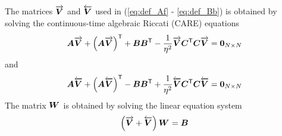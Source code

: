 The matrices $\overrightarrow{\bm{V}}$ and $\overleftarrow{\bm{V}}$ used in (\ref{eq:def_Af} - \ref{eq:def_Bb}) is obtained by solving the continuous-time algebraic Riccati (CARE) equations
\begin{equation}
    \label{eq:Vf_care}
    \bm{A}\overrightarrow{\bm{V}} + \left( \bm{A}\overrightarrow{\bm{V}} \right)^\mathsf{T} + \bm{B} \bm{B}^\mathsf{T} - \frac{1}{\eta^2}\overrightarrow{\bm{V}}\bm{C}^\mathsf{T}\bm{C}\overrightarrow{\bm{V}} = \bm{0}_{N \times N}
\end{equation}
and
\begin{equation}
    \label{eq:Vb_care}
    \bm{A}\overleftarrow{\bm{V}} + \left( \bm{A}\overleftarrow{\bm{V}} \right)^\mathsf{T} - \bm{B} \bm{B}^\mathsf{T} + \frac{1}{\eta^2}\overleftarrow{\bm{V}}\bm{C}^\mathsf{T}\bm{C}\overleftarrow{\bm{V}} = \bm{0}_{N \times N}
\end{equation}
The matrix $\bm{W}^\mathsf{}$ is obtained by solving the linear equation system
\begin{equation}
    \label{eq:W_sys}
    \left( \overrightarrow{\bm{V}} + \overleftarrow{\bm{V}} \right)\bm{W}^\mathsf{} = \bm{B}
\end{equation}

